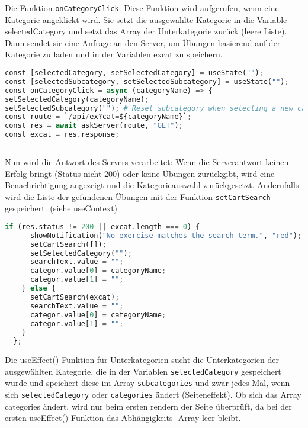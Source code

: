 Die Funktion \texttt{onCategoryClick}: Diese Funktion wird aufgerufen, wenn eine Kategorie angeklickt wird. Sie setzt die ausgewählte Kategorie in die Variable selectedCategory und setzt das Array der Unterkategorie zurück (leere Liste). Dann sendet sie eine Anfrage an den Server, um Übungen basierend auf der Kategorie zu laden und in der Variablen excat zu speichern.

\begin{lstlisting}[language=Python]
const [selectedCategory, setSelectedCategory] = useState("");
const [selectedSubcategory, setSelectedSubcategory] = useState("");
const onCategoryClick = async (categoryName) => {
setSelectedCategory(categoryName);
setSelectedSubcategory(""); # Reset subcategory when selecting a new category
const route = `/api/ex?cat=${categoryName}`;
const res = await askServer(route, "GET");
const excat = res.response;
    
\end{lstlisting}

Nun wird die Antwort des Servers verarbeitet: Wenn die Serverantwort keinen Erfolg bringt (Status nicht 200) oder keine Übungen zurückgibt, wird eine Benachrichtigung angezeigt und die Kategorieauswahl zurückgesetzt. Andernfalls wird die Liste der gefundenen Übungen mit der Funktion \texttt{setCartSearch} gespeichert. (siehe useContext)


\begin{lstlisting}[language=Python]
    if (res.status != 200 || excat.length === 0) {
      showNotification("No exercise matches the search term.", "red");
      setCartSearch([]);
      setSelectedCategory("");
      searchText.value = "";
      categor.value[0] = categoryName;
      categor.value[1] = "";
    } else {
      setCartSearch(excat);
      searchText.value = "";
      categor.value[0] = categoryName;
      categor.value[1] = "";
    }
  };


\end{lstlisting}



Die useEffect() Funktion für Unterkategorien sucht die Unterkategorien der ausgewählten Kategorie, die in der Variablen \texttt{selectedCategory} gespeichert wurde und speichert diese im Array \texttt{subcategories} und zwar jedes Mal, wenn sich \texttt{selectedCategory} oder \texttt{categories} ändert (Seiteneffekt). Ob sich das Array categories ändert, wird nur beim ersten rendern der Seite überprüft, da bei der ersten useEffect() Funktion das Abhängigkeits- Array leer bleibt.


